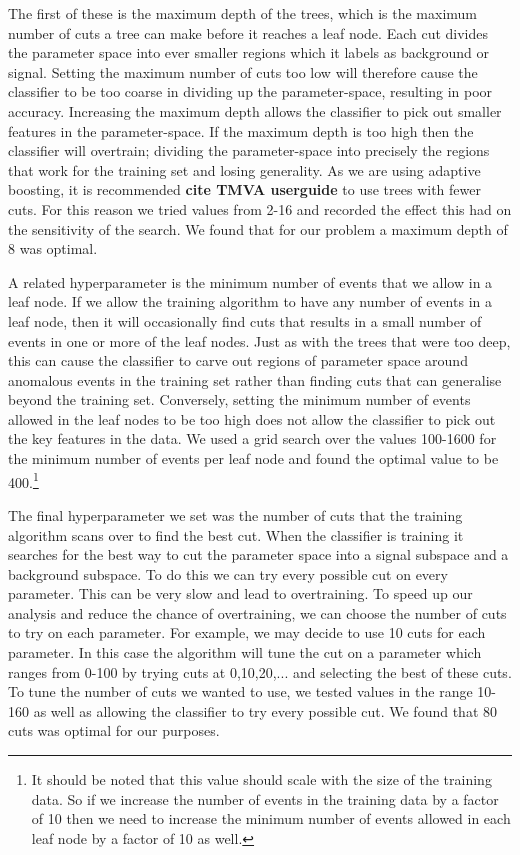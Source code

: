 \documentclass[11pt]{cuthesis}
\begin{document}
The first of these is the maximum depth of the trees, which is the maximum number of cuts a tree can make before it reaches a leaf node. Each cut divides the parameter space into ever smaller regions which it labels as background or signal. Setting the maximum number of cuts too low will therefore cause the classifier to be too coarse in dividing up the parameter-space, resulting in poor accuracy. Increasing the maximum depth allows the classifier to pick out smaller features in the parameter-space. If the maximum depth is too high then the classifier will overtrain; dividing the parameter-space into precisely the regions that work for the training set and losing generality. As we are using adaptive boosting, it is recommended \textbf{cite TMVA userguide} to use trees with fewer cuts. For this reason we tried values from 2-16 and recorded the effect this had on the sensitivity of the search. We found that for our problem a maximum depth of 8 was optimal. 

A related hyperparameter is the minimum number of events that we allow in a leaf node. If we allow the training algorithm to have any number of events in a leaf node, then it will occasionally find cuts that results in a small number of events in one or more of the leaf nodes. Just as with the trees that were too deep, this can cause the classifier to carve out regions of parameter space around anomalous events in the training set rather than finding cuts that can generalise beyond the training set. Conversely, setting the minimum number of events allowed in the leaf nodes to be too high does not allow the classifier to pick out the key features in the data. We used a grid search over the values 100-1600 for the minimum number of events per leaf node and found the optimal value to be 400.\footnote{It should be noted that this value should scale with the size of the training data. So if we increase the number of events in the training data by a factor of 10 then we need to increase the minimum number of events allowed in each leaf node by a factor of 10 as well.} 

The final hyperparameter we set was the number of cuts that the training algorithm scans over to find the best cut. When the classifier is training it searches for the best way to cut the parameter space into a signal subspace and a background subspace. To do this we can try every possible cut on every parameter. This can be very slow and lead to overtraining. To speed up our analysis and reduce the chance of overtraining, we can choose the number of cuts to try on each parameter. For example, we may decide to use 10 cuts for each parameter. In this case the algorithm will tune the cut on a parameter which ranges from 0-100 by trying cuts at 0,10,20,... and selecting the best of these cuts. To tune the number of cuts we wanted to use, we tested values in the range 10-160 as well as allowing the classifier to try every possible cut. We found that 80 cuts was optimal for our purposes. 
\end{document}
